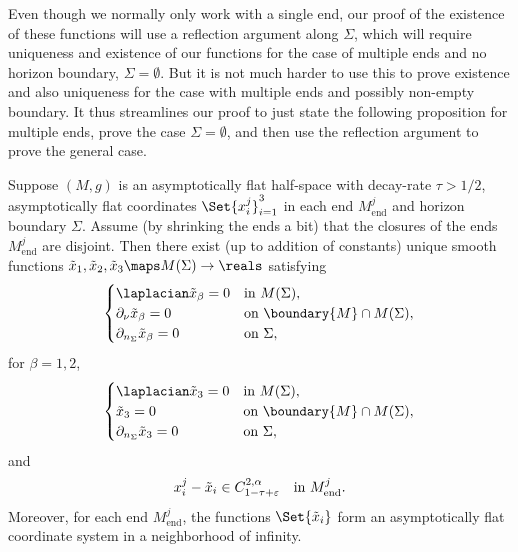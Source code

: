 \documentclass[titlepage,numbers=noenddot,oneside,%
cleardoublepage=empty,paper=a4,fontsize=11pt,%
english,%
]{scrartcl}
\newcommand{\Mend}{M_{\mathrm{end}}} %
\begin{document}

Even though we normally only work with a single end, our proof of the existence of these functions will use a reflection argument along \( \Sigma \), which will require uniqueness and existence of our functions for the case of multiple ends and no horizon boundary, \ie \( \Sigma=\emptyset \). But it is not much harder to use this to prove existence and also uniqueness for the case with multiple ends and possibly non-empty boundary. It thus streamlines our proof to just state the following proposition for multiple ends, prove the case \( \Sigma=\emptyset \), and then use the reflection argument to prove the general case.
\begin{proposition}\label{prop:existence_and_uniqueness}
    Suppose \( (M,g) \) is an asymptotically flat half-space with decay-rate \( \tau>1/2 \), asymptotically flat coordinates \( \Set{x_i^j}_{i=1}^3 \) in each end \( \Mend^j \) and horizon boundary \( \Sigma \). Assume (\eg by shrinking the ends a bit) that the closures of the ends \( \Mend^j \) are disjoint. Then there exist (up to addition of constants) unique smooth functions \( \tilde{x}_1,\tilde{x}_2,\tilde{x}_3\maps M(\Sigma)\to \reals \) satisfying
    \begin{equation*}
        \begin{cases}
            \laplacian \tilde{x}_\beta=0& \text{in \( M(\Sigma) \)},\\
            \partial_\nu \tilde{x}_\beta=0& \text{on \( \boundary{M}\cap M(\Sigma) \)},\\
            \partial_{n_\Sigma}\tilde{x}_\beta=0&\text{on \( \Sigma \)},
        \end{cases}
    \end{equation*}
    for \( \beta=1,2 \),
    \begin{equation*}
        \begin{cases}
            \laplacian \tilde{x}_3=0& \text{in \( M(\Sigma) \)},\\
            \tilde{x}_3=0& \text{on \( \boundary{M}\cap M(\Sigma) \)},\\
            \partial_{n_{\Sigma}}\tilde{x}_3=0& \text{on \( \Sigma \)},
        \end{cases}
    \end{equation*}
    and
    \begin{equation*}
        x_i^j-\tilde{x}_i\in C_{1-\tau+\varepsilon}^{2,\alpha} \quad \text{in \( \Mend^j \)}.
    \end{equation*}
    Moreover, for each end \( \Mend^j \), the functions \( \Set{\tilde{x}_i} \) form an asymptotically flat coordinate system in a neighborhood of infinity.
\end{proposition} 
\end{document}
